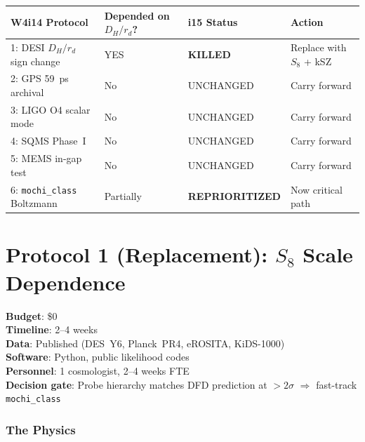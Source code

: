\documentclass[11pt]{article}
\begin{document}
\begin{center}
\renewcommand{\arraystretch}{1.3}
\begin{tabular}{@{}llll@{}}
\toprule
\textbf{W4i14 Protocol} & \textbf{Depended on $D_H/r_d$?} &
  \textbf{i15 Status} & \textbf{Action} \\
\midrule
1: DESI $D_H/r_d$ sign change & YES & \textbf{KILLED} &
  Replace with $S_8$ + kSZ \\
2: GPS 59~ps archival & No & UNCHANGED & Carry forward \\
3: LIGO O4 scalar mode & No & UNCHANGED & Carry forward \\
4: SQMS Phase~I & No & UNCHANGED & Carry forward \\
5: MEMS in-gap test & No & UNCHANGED & Carry forward \\
6: \texttt{mochi\_class} Boltzmann & Partially & \textbf{REPRIORITIZED} &
  Now critical path \\
\bottomrule
\end{tabular}
\end{center}


\part{Protocol 1 (Replacement): $S_8$ Scale Dependence}
\label{part:s8}

\begin{tcolorbox}[colback=green!3!white, colframe=actioncolor,
  title=\textbf{PROTOCOL 1R: $S_8$ PROBE HIERARCHY --- READY TO EXECUTE}]
\textbf{Budget}: \$0\\
\textbf{Timeline}: 2--4 weeks\\
\textbf{Data}: Published (DES~Y6, Planck~PR4, eROSITA, KiDS-1000)\\
\textbf{Software}: Python, public likelihood codes\\
\textbf{Personnel}: 1 cosmologist, 2--4 weeks FTE\\
\textbf{Decision gate}: Probe hierarchy matches DFD prediction at
$> 2\sigma$ $\Rightarrow$ fast-track \texttt{mochi\_class}
\end{tcolorbox}

\section{The Physics}
\end{document}

